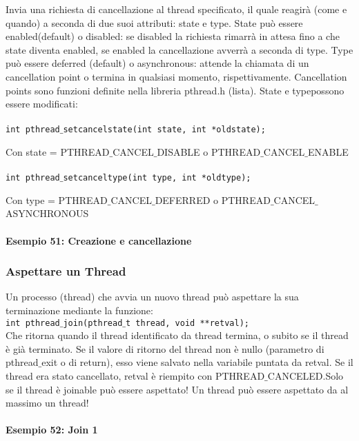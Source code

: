         Invia una richiesta di cancellazione al thread specificato, il quale reagirà (come e quando)  a  seconda  di  due  suoi  attributi: state e type. State può  essere enabled(default) o disabled: se disabled la richiesta rimarrà in attesa fino a che state diventa enabled, se enabled la cancellazione avverrà a seconda di type. Type può essere deferred (default) o asynchronous: attende la chiamata di un cancellation point o termina  in  qualsiasi  momento,  rispettivamente.  Cancellation  points  sono  funzioni definite nella libreria pthread.h (lista). State e typepossono essere modificati:\\ \\
        \texttt{int pthread$\_$setcancelstate(int state, int *oldstate);}
        
        Con state = PTHREAD$\_$CANCEL$\_$DISABLE o PTHREAD$\_$CANCEL$\_$ENABLE 
        \\ \\
        \texttt{int pthread$\_$setcanceltype(int type, int *oldtype);}
        
        Con type = PTHREAD$\_$CANCEL$\_$DEFERRED o PTHREAD$\_$CANCEL$\_$ASYNCHRONOUS
            \paragraph{Esempio 51: Creazione e cancellazione}\hfill \break
            
        \subsubsection{Aspettare un Thread}
        Un processo (thread) che avvia un nuovo thread può aspettare la sua terminazione mediante la funzione:\\ 
        \texttt{int pthread$\_$join(pthread$\_$t thread, void **retval);}\\
        Che ritorna quando il thread identificato da thread termina, o subito se il thread è già terminato. Se il valore di ritorno del thread non è nullo (parametro di pthread$\_$exit o di return), esso viene salvato nella variabile puntata da retval. Se il thread era stato cancellato, retval è riempito con PTHREAD$\_$CANCELED.Solo se il thread è joinable può essere aspettato! Un thread può essere aspettato da al massimo un thread!
            \paragraph{Esempio 52: Join 1}\hfill \break
            
